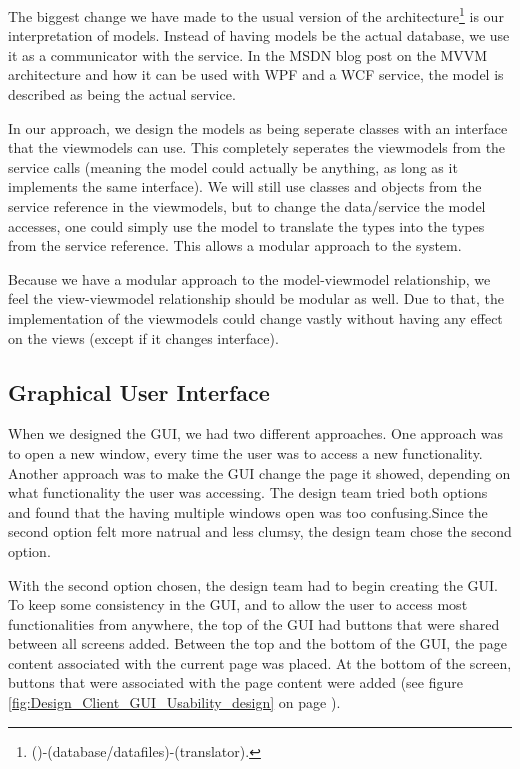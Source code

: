 The biggest change we have made to the usual version of the architecture\footnote{()-(database/datafiles)-(translator).} is our interpretation of models. Instead of having models be the actual database, we use it as a communicator with the service. In the MSDN blog post on the MVVM architecture \cite{MSDN-WPF-MVVM} and how it can be used with WPF and a WCF service, the model is described as being the actual service. 

In our approach, we design the models as being seperate classes with an interface that the viewmodels can use. This completely seperates the viewmodels from the service calls (meaning the model could actually be anything, as long as it implements the same interface). We will still use classes and objects from the service reference in the viewmodels, but to change the data/service the model accesses, one could simply use the model to translate the types into the types from the service reference. This allows a modular approach to the system.

Because we have a modular approach to the model-viewmodel relationship, we feel the view-viewmodel relationship should be modular as well.  Due to that, the implementation of the viewmodels could change vastly without having any effect on the views (except if it changes interface).

\subsection{Graphical User Interface}
\label{Design_Client_GUI}
When we designed the GUI, we had two different approaches. One approach was to open a new window, every time the user was to access a new functionality. Another approach was to make the GUI change the page it showed, depending on what functionality the user was accessing. The design team tried both options and found that the having multiple windows open was too confusing.Since the second option felt more natrual and less clumsy, the design team chose the second option.

With the second option chosen, the design team had to begin creating the GUI. To keep some consistency in the GUI, and to allow the user to access most functionalities from anywhere, the top of the GUI had buttons that were shared between all screens added. Between the top and the bottom of the GUI, the page content associated with the current page was placed. At the bottom of the screen, buttons that were associated with the page content were added (see figure \ref{fig:Design_Client_GUI_Usability_design} on page \pageref{fig:Design_Client_GUI_Usability_design}).

